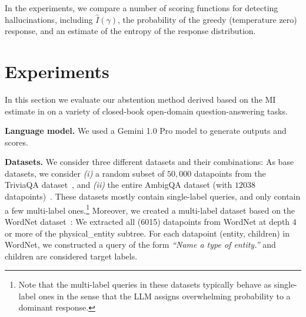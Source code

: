 \documentclass[a4paper]{article}
\newcommand{\txtfont}{\fontfamily{qcr}\selectfont}
\theoremstyle{plain}
\theoremstyle{definition}
\theoremstyle{plain}
\begin{document}
In the experiments, we compare a number of scoring functions for detecting hallucinations, including $\widehat I(\gamma)$, the probability of the greedy (temperature zero) response, and an estimate of the entropy of the response distribution.  
%



\section{Experiments}
\label{sec:experiments}

In this section we evaluate our abstention method derived based on the MI estimate in  on a variety of closed-book open-domain question-answering tasks.

\textbf{Language model.} We used a Gemini 1.0 Pro model \citep{geminiteam2023gemini} to generate outputs and scores.

\textbf{Datasets.} We consider three different datasets and their combinations: As base datasets, we consider \emph{(i)} a random subset of $50,000$ datapoints from the TriviaQA dataset~\citep{joshi2017triviaqa}, and \emph{(ii)} the entire AmbigQA dataset (with $12038$ datapoints)~\citep{min2020ambigqa}. These datasets mostly contain single-label queries, and only contain a few multi-label ones.\footnote{Note that the multi-label queries in these datasets typically behave as single-label ones in the sense that the LLM assigns overwhelming probability to a dominant response.}  
Moreover, we created a multi-label dataset based on the WordNet dataset~\citep{fellbaum1998wordnet}: We extracted all (6015) datapoints from WordNet at depth $4$ or more of the {\txtfont physical\_entity} subtree. For each datapoint {\txtfont (entity, children)} in WordNet, we constructed a query of the form \emph{``Name a type of {\txtfont entity}.''} and {\txtfont children} are considered target labels. 
\end{document}
